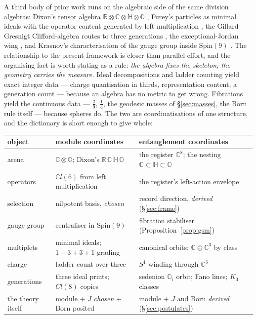 A third body of prior work runs on the algebraic side of the same division algebras: Dixon's
tensor algebra $\mathbb{R} \otimes \mathbb{C} \otimes \mathbb{H} \otimes \mathbb{O}$
\autocite{dixon1994division}, Furey's particles as minimal ideals with the operator content
generated by left multiplication \autocite{furey2012unified,furey2018three}, the
Gillard--Gresnigt Clifford-algebra routes to three generations
\autocite{gillardgresnigt2019three}, the exceptional-Jordan wing
\autocite{duboisviolettetodorov2019exceptional}, and Krasnov's characterisation of the gauge
group inside $\mathrm{Spin}(9)$ \autocite{krasnov2021so9}. The relationship to the present
framework is closer than parallel effort, and the organising fact is worth stating as a rule:
\emph{the algebra fixes the skeleton; the geometry carries the measure.} Ideal decompositions
and ladder counting yield exact integer data --- charge quantisation in thirds, representation
content, a generation count --- because an algebra has no metric to get wrong. Fibrations yield
the continuous data --- $\tfrac29$, $\tfrac14$, the geodesic masses of \S\ref{sec:masses}, the
Born rule itself --- because spheres do. The two are coordinatisations of one structure, and the
dictionary is short enough to give whole:

\begin{center}
\begin{tabular}{lll}
\hline
object & module coordinates & entanglement coordinates \\
\hline
arena & $\mathbb{C}\otimes\mathbb{O}$; Dixon's $\mathbb{R\,C\,H\,O}$ &
  the register $\mathbb{C}^8$; the nesting $\mathbb{C}\subset\mathbb{H}\subset\mathbb{O}$ \\
operators & $\mathbb{C}l(6)$ from left multiplication &
  the register's left-action envelope \\
selection & nilpotent basis, \emph{chosen} &
  record direction, \emph{derived} (\S\ref{sec:frame}) \\
gauge group & centraliser in $\mathrm{Spin}(9)$ &
  fibration stabiliser (Proposition~\ref{prop:gsm}) \\
multiplets & minimal ideals; $1{+}3{+}3{+}1$ grading &
  canonical orbits; $\mathbb{C}\oplus\mathbb{C}^3$ by class \\
charge & ladder count over three &
  $S^1$ winding through $\mathbb{C}^3$ \\
generations & three ideal prints; $Cl(8)$ copies &
  sedenion $\mathbb{O}_i$ orbit; Fano lines; $K_3$ classes \\
the theory itself & module + $J$ \emph{chosen} + Born posited &
  module + $J$ and Born \emph{derived} (\S\ref{sec:postulates}) \\
\hline
\end{tabular}
\end{center}

